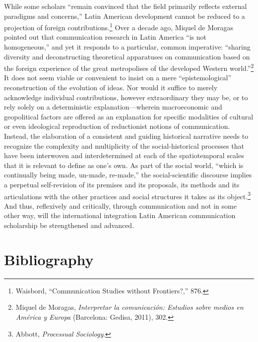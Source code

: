\documentclass{tufte-handout}
\begin{document}
While some scholars ``remain convinced that the field primarily reflects
external paradigms and concerns,'' Latin American development cannot be
reduced to a projection of foreign contributions.\footnote{Waisbord,
  ``Communication Studies without Frontiers?,'' 876.} Over a decade ago,
Miquel de Moragas pointed out that communication research in Latin
America ``is not homogeneous,'' and yet it responds to a particular,
common imperative: ``sharing diversity and deconstructing theoretical
apparatuses on communication based on the foreign experience of the
great metropolises of the developed Western world.''\footnote{Miquel de
  Moragas, \emph{Interpretar la comunicación: Estudios sobre medios en
  América y Europa} (Barcelona: Gedisa, 2011), 302.} It does not seem
viable or convenient to insist on a mere ``epistemological''
reconstruction of the evolution of ideas. Nor would it suffice to merely
acknowledge individual contributions, however extraordinary they may be,
or to rely solely on a deterministic explanation---wherein macroeconomic
and geopolitical factors are offered as an explanation for specific
modalities of cultural or even ideological reproduction of reductionist
notions of communication. Instead, the elaboration of a consistent and
guiding historical narrative needs to recognize the complexity and
multiplicity of the social-historical processes that have been
interwoven and interdetermined at each of the spatiotemporal scales that
it is relevant to define as one's own. As part of the social world,
``which is continually being made, un-made, re-made,'' the
social-scientific discourse implies a perpetual self-revision of its
premises and its proposals, its methods and its articulations with the
other practices and social structures it takes as its object.\footnote{Abbott,
  \emph{Processual Sociology}.} And thus, reflexively and critically,
through communication and not in some other way, will the international
integration Latin American communication scholarship be strengthened and
advanced.




\section{Bibliography}\label{bibliography}
\end{document}
